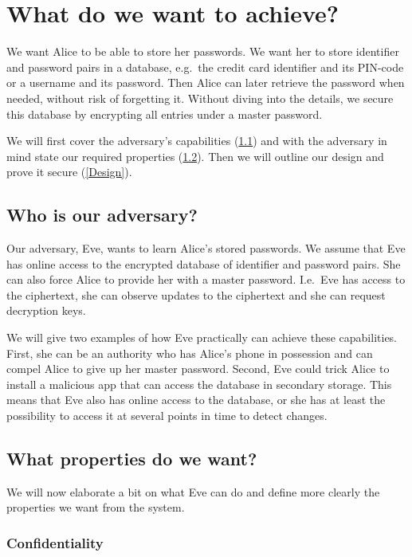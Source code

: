 \section{What do we want to achieve?}

We want Alice to be able to store her passwords.
We want her to store identifier and password pairs in a database, e.g.\ the 
credit card identifier and its PIN-code or a username and its password.
Then Alice can later retrieve the password when needed, without risk of 
forgetting it.
Without diving into the details, we secure this database by encrypting all 
entries under a master password.

We will first cover the adversary's capabilities (\cref{AdversaryModel}) and 
with the adversary in mind state our required properties 
(\cref{RequiredProperties}).
Then we will outline our design and prove it secure (\cref{Design}).

\subsection{Who is our adversary?}
\label{AdversaryModel}

Our adversary, Eve, wants to learn Alice's stored passwords.
We assume that Eve has online access to the encrypted database of identifier 
and password pairs.
She can also force Alice to provide her with a master password.
I.e.\ Eve has access to the ciphertext, she can observe updates to the
ciphertext and she can request decryption keys.

We will give two examples of how Eve practically can achieve these 
capabilities.
First, she can be an authority who has Alice's phone in possession and can 
compel Alice to give up her master password.
Second, Eve could trick Alice to install a malicious app that can access the 
database in secondary storage.
This means that Eve also has online access to the database, or she has at least
the possibility to access it at several points in time to detect changes.

\subsection{What properties do we want?}
\label{RequiredProperties}

We will now elaborate a bit on what Eve can do and define more clearly the 
properties we want from the system.

\subsubsection{Confidentiality}

